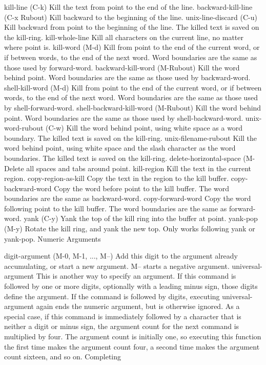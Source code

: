 \documentclass[11pt]{article}
\begin{document}
{{{kill-line (C-k)
Kill the text from point to the end of the line.
backward-kill-line (C-x Rubout)
Kill backward to the beginning of the line.
unix-line-discard (C-u)
Kill backward from point to the beginning of the line. The killed text is saved on the kill-ring.
kill-whole-line
Kill all characters on the current line, no matter where point is.
kill-word (M-d)
Kill from point to the end of the current word, or if between words, to the end of the next word. Word boundaries are the same as those used by forward-word.
backward-kill-word (M-Rubout)
Kill the word behind point. Word boundaries are the same as those used by backward-word.
shell-kill-word (M-d)
Kill from point to the end of the current word, or if between words, to the end of the next word. Word boundaries are the same as those used by shell-forward-word.
shell-backward-kill-word (M-Rubout)
Kill the word behind point. Word boundaries are the same as those used by shell-backward-word.
unix-word-rubout (C-w)
Kill the word behind point, using white space as a word boundary. The killed text is saved on the kill-ring.
unix-filename-rubout
Kill the word behind point, using white space and the slash character as the word boundaries. The killed text is saved on the kill-ring.
delete-horizontal-space (M-\)
Delete all spaces and tabs around point.
kill-region
Kill the text in the current region.
copy-region-as-kill
Copy the text in the region to the kill buffer.
copy-backward-word
Copy the word before point to the kill buffer. The word boundaries are the same as backward-word.
copy-forward-word
Copy the word following point to the kill buffer. The word boundaries are the same as forward-word.
yank (C-y)
Yank the top of the kill ring into the buffer at point.
yank-pop (M-y)
Rotate the kill ring, and yank the new top. Only works following yank or yank-pop.
Numeric Arguments

digit-argument (M-0, M-1, ..., M--)
Add this digit to the argument already accumulating, or start a new argument. M-- starts a negative argument.
universal-argument
This is another way to specify an argument. If this command is followed by one or more digits, optionally with a leading minus sign, those digits define the argument. If the command is followed by digits, executing universal-argument again ends the numeric argument, but is otherwise ignored. As a special case, if this command is immediately followed by a character that is neither a digit or minus sign, the argument count for the next command is multiplied by four. The argument count is initially one, so executing this function the first time makes the argument count four, a second time makes the argument count sixteen, and so on.
Completing

}}}
\end{document}

